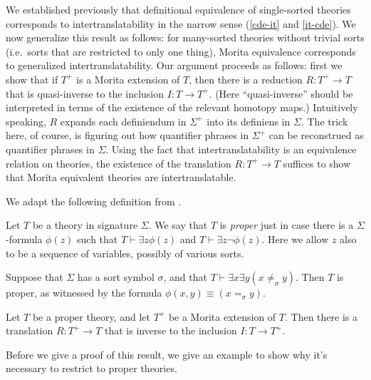 We established previously that definitional equivalence of
single-sorted theories corresponds to intertranslatability in the
narrow sense (\ref{cde-it} and \ref{it-cde}).  We now generalize this
result as follows: for many-sorted theories without trivial sorts
(i.e.\ sorts that are restricted to only one thing), Morita
equivalence corresponds to generalized intertranslatability.  Our
argument proceeds as follows: first we show that if $T^+$ is a Morita
extension of $T$, then there is a reduction $R:T^+\to T$ that is
quasi-inverse to the inclusion $I:T\to T^+$.  (Here ``quasi-inverse''
should be interpreted in terms of the existence of the relevant
homotopy maps.)  Intuitively speaking, $R$ expands each definiendum in
$\Sigma ^+$ into its definiens in $\Sigma$.  The trick here, of
course, is figuring out how quantifier phrases in $\Sigma ^+$ can be
reconstrued as quantifier phrases in $\Sigma$.  Using the fact that
intertranslatability is an equivalence relation on theories, the
existence of the translation $R:T^+\to T$ suffices to show that Morita
equivalent theories are intertranslatable.

We adapt the following definition from \cite{harnik}.

\begin{defn} Let $T$ be a theory in signature $\Sigma$.  We say that
  $T$ is \emph{proper} just in case there is a $\Sigma$-formula
  $\phi (z)$ such that $T\vdash\exists z\phi (z)$ and
  $T\vdash\exists z\neg \phi (z)$.  Here we allow $z$ also to be a
  sequence of variables, possibly of various sorts.  \end{defn}

\begin{note} Suppose that $\Sigma$ has a sort symbol $\sigma$, and
  that $T\vdash \exists x\exists y(x\neq _\sigma y)$.  Then $T$ is
  proper, as witnessed by the formula
  $\phi (x,y)\equiv (x=_\sigma y)$.
\end{note}

\begin{thm}[Washington] Let $T$ be a proper theory, and let $T^+$ be a
  Morita extension of $T$.  Then there is a translation $R:T^+\to T$
  that is inverse to the inclusion $I:T\to
  T^+$. \label{redux} \end{thm}

Before we give a proof of this result, we give an example to show why
it's necessary to restrict to proper theories.

